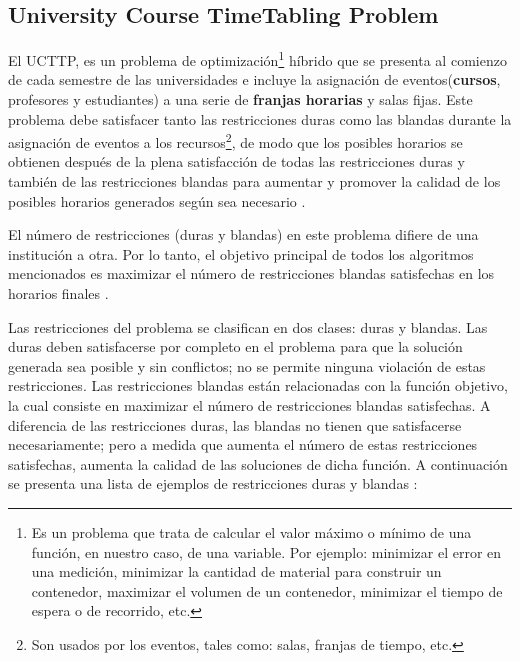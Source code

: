 

\subsection{University Course TimeTabling Problem}

El UCTTP, es un problema de optimización\footnote{Es un problema que trata de calcular el valor máximo o mínimo de una función, en nuestro caso, de una variable. Por ejemplo: minimizar el error en una medición, minimizar la cantidad de material para construir un contenedor, maximizar el volumen de un contenedor, minimizar el tiempo de espera o de recorrido, etc.} híbrido que se presenta al comienzo de cada semestre de las universidades e incluye la asignación de eventos(\textbf{cursos}, profesores y estudiantes) a una serie de \textbf{franjas horarias} y salas fijas. Este problema debe satisfacer tanto las restricciones duras como las blandas durante la asignación de eventos a los recursos\footnote{Son usados por los eventos, tales como: salas, franjas de tiempo, etc.}, de modo que los posibles horarios se obtienen después de la plena satisfacción de todas las restricciones duras y también de las restricciones blandas para aumentar y promover la calidad de los posibles horarios generados según sea necesario \cite{UCTTP_ThreePhaseApproach}.\newline

El número de restricciones (duras y blandas) en este problema difiere de una institución a otra. Por lo tanto, el objetivo principal de todos los algoritmos mencionados es maximizar el número de restricciones blandas satisfechas en los horarios finales \cite{article_1445178}.\newline

Las restricciones del problema se clasifican en dos clases: duras y blandas. Las duras deben satisfacerse por completo en el problema para que la solución generada sea posible y sin conflictos; no se permite ninguna violación de estas restricciones. Las restricciones blandas están relacionadas con la función objetivo, la cual consiste en maximizar el número de restricciones blandas satisfechas. A diferencia de las restricciones duras, las blandas no tienen que satisfacerse necesariamente; pero a medida que aumenta el número de estas restricciones satisfechas, aumenta la calidad de las soluciones de dicha función. A continuación se presenta una lista de ejemplos de restricciones duras y blandas \cite{BABAEI201543}:

